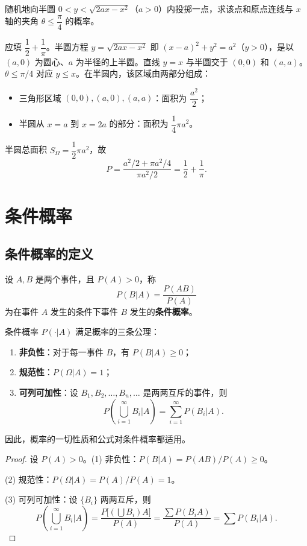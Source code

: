 \documentclass[lang=cn,11pt]{elegantbook}
\begin{document}
\begin{exercise}\label{exer:1-38}
随机地向半圆 \(0<y<\sqrt{2ax-x^2}\)（\(a>0\)）内投掷一点，求该点和原点连线与 \(x\) 轴的夹角 \(\theta\le\dfrac{\pi}{4}\) 的概率。
\end{exercise}
\begin{solution}
应填 \(\dfrac{1}{2}+\dfrac{1}{\pi}\)。半圆方程 \(y=\sqrt{2ax-x^2}\) 即 \((x-a)^2+y^2=a^2\)（\(y>0\)），是以 \((a,0)\) 为圆心、\(a\) 为半径的上半圆。直线 \(y=x\) 与半圆交于 \((0,0)\) 和 \((a,a)\)。\(\theta\le\pi/4\) 对应 \(y\le x\)。在半圆内，该区域由两部分组成：
\begin{itemize}
    \item 三角形区域 \((0,0),(a,0),(a,a)\)：面积为 \(\dfrac{a^2}{2}\)；
    \item 半圆从 \(x=a\) 到 \(x=2a\) 的部分：面积为 \(\dfrac{1}{4}\pi a^2\)。
\end{itemize}
半圆总面积 \(S_\Omega=\dfrac{1}{2}\pi a^2\)，故
\[P = \frac{a^2/2+\pi a^2/4}{\pi a^2/2} = \frac{1}{2}+\frac{1}{\pi}.\]
\end{solution}


\section{条件概率}

\subsection{条件概率的定义}

\begin{definition}[条件概率] \label{def:conditional-prob}
设 \(A, B\) 是两个事件，且 \(P(A) > 0\)，称
\[
P(B|A) = \frac{P(AB)}{P(A)}
\]
为在事件 \(A\) 发生的条件下事件 \(B\) 发生的\textbf{条件概率}。
\end{definition}

\begin{property}\label{prop:conditional-prob}
条件概率 \(P(\cdot|A)\) 满足概率的三条公理：
\begin{enumerate}
    \item \textbf{非负性}：对于每一事件 \(B\)，有 \(P(B|A) \ge 0\)；
    \item \textbf{规范性}：\(P(\Omega|A) = 1\)；
    \item \textbf{可列可加性}：设 \(B_1, B_2, \dots, B_n, \dots\) 是两两互斥的事件，则
    \[
    P\!\left(\bigcup_{i=1}^{\infty} B_i \Big| A\right) = \sum_{i=1}^{\infty} P(B_i|A).
    \]
\end{enumerate}
因此，概率的一切性质和公式对条件概率都适用。
\end{property}
\begin{proof}
设 \(P(A) > 0\)。(1) 非负性：\(P(B|A) = P(AB)/P(A) \geqslant 0\)。\par
(2) 规范性：\(P(\Omega|A) = P(A)/P(A) = 1\)。\par
(3) 可列可加性：设 \(\{B_i\}\) 两两互斥，则
\[
P\!\left(\bigcup_{i=1}^{\infty} B_i \Big| A\right) = \frac{P\!\bigl[(\bigcup B_i)A\bigr]}{P(A)} = \frac{\sum P(B_i A)}{P(A)} = \sum P(B_i|A).
\]
\end{proof}
\end{document}
